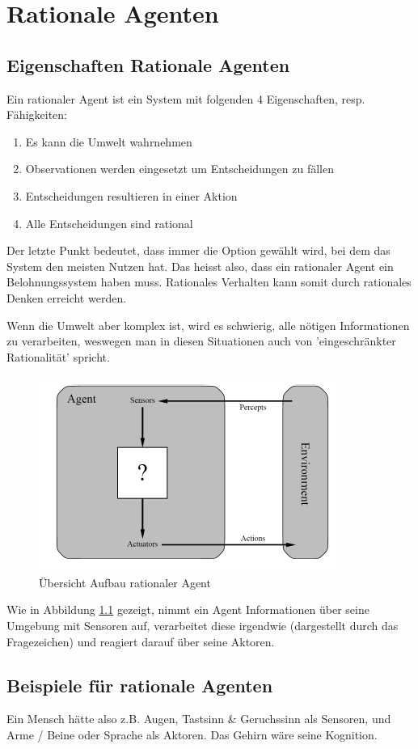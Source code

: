 \chapter{Rationale Agenten}
\section{Eigenschaften Rationale Agenten}
Ein rationaler Agent ist ein System mit folgenden 4 Eigenschaften, resp. Fähigkeiten:
\begin{enumerate}
	\item Es kann die Umwelt wahrnehmen
	\item Observationen werden eingesetzt um Entscheidungen zu fällen
	\item Entscheidungen resultieren in einer Aktion
	\item Alle Entscheidungen sind rational
\end{enumerate}

Der letzte Punkt bedeutet, dass immer die Option gewählt wird, bei dem das System den meisten Nutzen hat. Das heisst also, dass ein rationaler Agent ein Belohnungssystem haben muss. Rationales Verhalten kann somit durch rationales Denken erreicht werden.

Wenn die Umwelt aber komplex ist, wird es schwierig, alle nötigen Informationen zu verarbeiten, weswegen man in diesen Situationen auch von 'eingeschränkter Rationalität' spricht.

\begin{figure}[h!]
\centering
\includegraphics[width=0.4\linewidth]{fig/rationaler_agent}
\caption{Übersicht Aufbau rationaler Agent}
\label{fig:rationaler_agent}
\end{figure}

Wie in Abbildung \ref{fig:rationaler_agent} gezeigt, nimmt ein Agent Informationen über seine Umgebung mit Sensoren auf, verarbeitet diese irgendwie (dargestellt  durch das Fragezeichen) und reagiert darauf über seine Aktoren.

\section{Beispiele für rationale Agenten}
Ein Mensch hätte also z.B. Augen, Tastsinn \& Geruchssinn als Sensoren, und Arme / Beine oder Sprache als Aktoren. Das Gehirn wäre seine Kognition.

